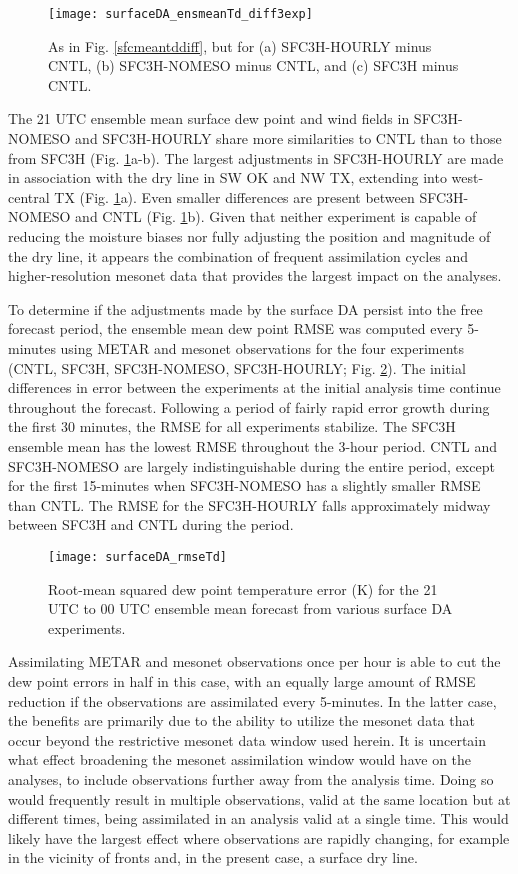 \begin{figure}
\centering
\texttt{[image: surfaceDA\_ensmeanTd\_diff3exp]}
\caption{As in Fig. \ref{sfcmeantddiff}, but for (a) SFC3H-HOURLY minus CNTL, (b) SFC3H-NOMESO minus CNTL, and (c) SFC3H minus CNTL.}
\label{sfcmeantddiff3exp}
\end{figure}

The 21 UTC ensemble mean surface dew point and wind fields in SFC3H-NOMESO and SFC3H-HOURLY share more similarities to CNTL than to those from SFC3H (Fig. \ref{sfcmeantddiff3exp}a-b). The largest adjustments in SFC3H-HOURLY are made in association with the dry line in SW OK and NW TX, extending into west-central TX (Fig. \ref{sfcmeantddiff3exp}a). Even smaller differences are present between SFC3H-NOMESO and CNTL (Fig. \ref{sfcmeantddiff3exp}b). Given that neither experiment is capable of reducing the moisture biases nor fully adjusting the position and magnitude of the dry line, it appears the combination of frequent assimilation cycles and higher-resolution mesonet data that provides the largest impact on the analyses.

To determine if the adjustments made by the surface DA persist into the free forecast period, the ensemble mean dew point RMSE was computed every 5-minutes using METAR and mesonet observations for the four experiments (CNTL, SFC3H, SFC3H-NOMESO, SFC3H-HOURLY; Fig. \ref{sfcmeantdrmse}). The initial differences in error between the experiments at the initial analysis time continue throughout the forecast. Following a period of fairly rapid error growth during the first 30 minutes, the RMSE for all experiments stabilize. The SFC3H ensemble mean has the lowest RMSE throughout the 3-hour period. CNTL and SFC3H-NOMESO are largely indistinguishable during the entire period, except for the first 15-minutes when SFC3H-NOMESO has a slightly smaller RMSE than CNTL. The RMSE for the SFC3H-HOURLY falls approximately midway between SFC3H and CNTL during the period. 
\begin{figure}
\centering
\texttt{[image: surfaceDA\_rmseTd]}
\caption{Root-mean squared dew point temperature error (K) for the 21 UTC to 00 UTC ensemble mean forecast from various surface DA experiments.}
\label{sfcmeantdrmse}
\end{figure}
Assimilating METAR and mesonet observations once per hour is able to cut the dew point errors in half in this case, with an equally large amount of RMSE reduction if the observations are assimilated every 5-minutes. In the latter case, the benefits are primarily due to the ability to utilize the mesonet data that occur beyond the restrictive mesonet data window used herein. It is uncertain what effect broadening the mesonet assimilation window would have on the analyses, to include observations further away from the analysis time. Doing so would frequently result in multiple observations, valid at the same location but at different times, being assimilated in an analysis valid at a single time. This would likely have the largest effect where observations are rapidly changing, for example in the vicinity of fronts and, in the present case, a surface dry line. 

